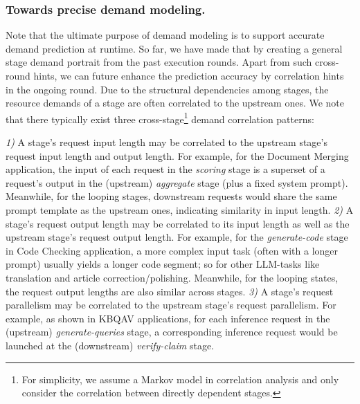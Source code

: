 


\subsubsection{Towards precise demand modeling.}
\label{subsubsec:correlation_analysis}

Note that the ultimate purpose of demand modeling is to support accurate demand prediction at runtime. 
So far, we have made that by creating a general stage demand portrait from the past execution rounds.
Apart from such cross-round hints, we can future enhance the prediction accuracy by correlation hints in the ongoing round.
Due to the structural dependencies among stages, the resource demands of a stage are often correlated to the upstream ones. 
We note that there typically exist three cross-stage\footnote{
    For simplicity, we assume a Markov model in correlation analysis and only consider the correlation between directly dependent stages.
    }
demand correlation patterns:

    \emph{1)} A stage's request input length may be correlated to the upstream stage's request input length and output length.
        For example, for the Document Merging application, the input of each request in the \emph{scoring} stage is a superset of a request's output in the (upstream) \emph{aggregate} stage (plus a fixed system prompt). 
        Meanwhile, for the looping stages, downstream requests would share the same prompt template as the upstream ones, indicating similarity in input length.
    \emph{2)} A stage's request output length may be correlated to its input length as well as the upstream stage's request output length.
	For example, for the \emph{generate-code} stage in Code Checking application, a more complex input task (often with a longer prompt) usually yields a longer code segment; so for other LLM-tasks like translation and article correction/polishing.
	Meanwhile, for the looping states, the request output lengths are also similar across stages.
    \emph{3)} A stage's request parallelism may be correlated to the upstream stage's request parallelism. 
	For example, as shown in KBQAV applications, for each inference request in the (upstream) \emph{generate-queries} stage, a corresponding inference request would be launched at the (downstream) \emph{verify-claim} stage.

